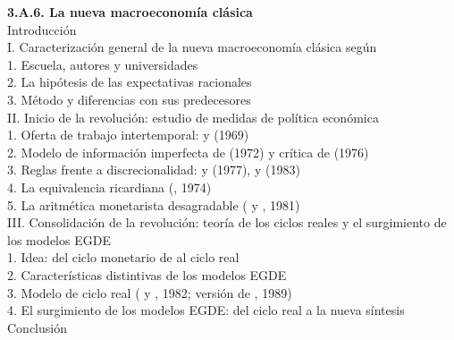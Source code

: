 \documentclass[11pt]{article}
\begin{document}
\begin{esquema}[unbreakable]
\textbf{3.A.6. La nueva macroeconomía clásica}\\[2pt]
Introducción\\
I. Caracterización general de la nueva macroeconomía clásica según \\
\hspace*{1.5em}1. Escuela, autores y universidades\\
\hspace*{1.5em}2. La hipótesis de las expectativas racionales\\
\hspace*{1.5em}3. Método y diferencias con sus predecesores\\
II. Inicio de la revolución: estudio de medidas de política económica\\
\hspace*{1.5em}1. Oferta de trabajo intertemporal:  y  (1969)\\
\hspace*{1.5em}2. Modelo de información imperfecta de  (1972) y crítica de  (1976)\\
\hspace*{1.5em}3. Reglas frente a discrecionalidad:  y  (1977),  y  (1983)\\
\hspace*{1.5em}4. La equivalencia ricardiana (, 1974)\\
\hspace*{1.5em}5. La aritmética monetarista desagradable ( y , 1981)\\
III. Consolidación de la revolución: teoría de los ciclos reales y el surgimiento de los modelos EGDE\\
\hspace*{1.5em}1. Idea: del ciclo monetario de  al ciclo real\\
\hspace*{1.5em}2. Características distintivas de los modelos EGDE\\
\hspace*{1.5em}3. Modelo de ciclo real ( y , 1982; versión de , 1989)\\
\hspace*{1.5em}4. El surgimiento de los modelos EGDE: del ciclo real a la nueva síntesis\\
Conclusión
\end{esquema}
\end{document}
